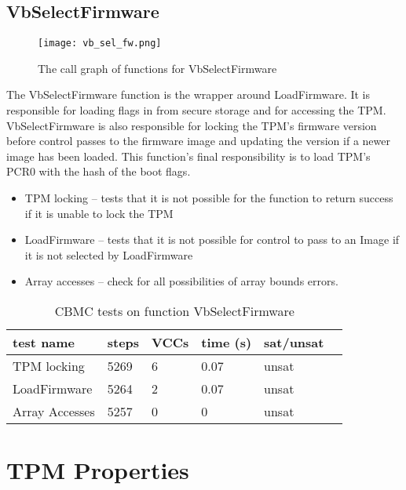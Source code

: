 \subsection{VbSelectFirmware}

\begin{figure}[!htbp]
  \centering
  \texttt{[image: vb\_sel\_fw.png]}
  \caption[VbSelectFirmware Call Graph]{The call graph of functions for VbSelectFirmware}\label{fig:vbselfw}
\end{figure}

The VbSelectFirmware function is the wrapper around LoadFirmware.
It is responsible for loading flags in from secure storage and for accessing the TPM\@.
VbSelectFirmware is also responsible for locking the TPM's firmware version before control passes to the firmware image and updating the version if a newer image has been loaded.
This function's final responsibility is to load TPM's PCR0 with the hash of the boot flags.

\begin{itemize}
 \item  TPM locking -- tests that it is not possible for the function to return success if it is unable to lock the TPM
 \item  LoadFirmware -- tests that it is not possible for control to pass to an Image if it is not selected by LoadFirmware
 \item  Array accesses -- check for all possibilities of array bounds errors.
\end{itemize}

\begin{table}[!htbp]
    \centering
    \caption{CBMC tests on function VbSelectFirmware}\label{sfw_results}
    \begin{tabular}{llllll}
        \toprule
        test name & steps & VCCs & time (s) & sat/unsat  \\ \bottomrule
        TPM locking & 5269 & 6 & 0.07 & unsat \\
        LoadFirmware & 5264 & 2 &  0.07 & unsat \\
        Array Accesses & 5257 & 0 & 0 &  unsat \\
    \end{tabular}
\end{table}

\section{TPM Properties}

